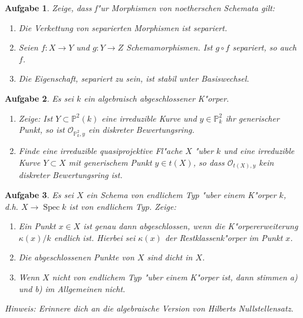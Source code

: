 \documentclass[paper = A4, fontsize=12pt, numbers=noendperiod, chapterprefix=true]{scrbook}
\theoremstyle{break}
\newtheorem{Aufg}{Aufgabe}
\theoremstyle{nonumberbreak}
\theoremstyle{nonumberplain}
\DeclareMathOperator{\Spec}{Spec}
\newcommand{\IP}{\mathbb{P}}%
\newcommand{\calO}{\mathcal{O}}
\begin{document}
\begin{Aufg}
Zeige, dass f"ur Morphismen von noetherschen Schemata gilt:
\begin{enumerate}%
 \item Die Verkettung von separierten Morphismen ist separiert.
 \item Seien $f \colon X \to Y$ und $g \colon Y \to Z$ Schemamorphismen. Ist $g\circ f$ separiert, so auch $f$.
 \item Die Eigenschaft, separiert zu sein, ist stabil unter Basiswechsel.
\end{enumerate}
\end{Aufg}

\begin{Aufg}
Es sei $k$ ein algebraisch abgeschlossener K"orper. 
\begin{enumerate}%
 \item Zeige: Ist $Y \subset \IP^2(k)$ eine irreduzible Kurve und $y \in \IP^2_k$ ihr generischer Punkt, so ist $\calO_{\IP^2_k,y}$ ein diskreter Bewertungsring.
 \item Finde eine irreduzible quasiprojektive Fl"ache $X$ "uber $k$ und eine irreduzible Kurve $Y \subset X$ mit generischem Punkt $y \in t(X)$, so dass $\calO_{t(X),y}$ kein diskreter Bewertungsring ist.
\end{enumerate}
\end{Aufg}

\begin{Aufg}
Es sei $X$ ein Schema von endlichem Typ "uber einem K"orper $k$, d.h. $X \to \Spec k$ ist von endlichem Typ. Zeige:
\begin{enumerate}%
 \item Ein Punkt $x\in X$ ist genau dann abgeschlossen, wenn die K"orpererweiterung $\kappa(x) / k$ endlich ist. Hierbei sei $\kappa(x)$ der Restklassenk"orper im Punkt $x$.
 \item Die abgeschlossenen Punkte von $X$ sind dicht in $X$.
 \item Wenn $X$ nicht von endlichem Typ "uber einem K"orper ist, dann stimmen a) und b) im Allgemeinen nicht.
\end{enumerate}
\textit{Hinweis: Erinnere dich an die algebraische Version von Hilberts Nullstellensatz.}
\end{Aufg}
\end{document}
